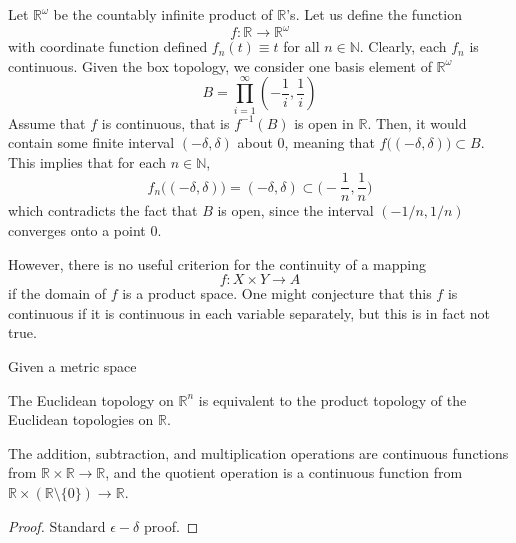   \begin{example}
    Let $\mathbb{R}^\omega$ be the countably infinite product of $\mathbb{R}$'s. Let us define the function 
    \begin{equation}
      f: \mathbb{R} \rightarrow \mathbb{R}^\omega
    \end{equation}
    with coordinate function defined $f_n (t) \equiv t$ for all $n \in \mathbb{N}$. Clearly, each $f_n$ is continuous. Given the box topology, we consider one basis element of $\mathbb{R}^\omega$
    \begin{equation}
      B = \prod_{i=1}^\infty (-\frac{1}{i}, \frac{1}{i})
    \end{equation}
    Assume that $f$ is continuous, that is $f^{-1}(B)$ is open in $\mathbb{R}$. Then, it would contain some finite interval $(-\delta, \delta)$ about $0$, meaning that $f\big( (-\delta, \delta)\big) \subset B$. This implies that for each $n \in \mathbb{N}$, 
    \begin{equation}
      f_n \big( (-\delta, \delta) \big) = (-\delta, \delta) \subset \Big( -\frac{1}{n}, \frac{1}{n} \Big)
    \end{equation}
    which contradicts the fact that $B$ is open, since the interval $(-1/n, 1/n)$ converges onto a point $0$. 
  \end{example}

  However, there is no useful criterion for the continuity of a mapping 
  \begin{equation}
    f: X \times Y \longrightarrow A
  \end{equation}
  if the domain of $f$ is a product space. One might conjecture that this $f$ is continuous if it is continuous in each variable separately, but this is in fact not true. 

  \begin{theorem}
    Given a metric space
  \end{theorem}

  \begin{corollary}
    The Euclidean topology on $\mathbb{R}^n$ is equivalent to the product topology of the Euclidean topologies on $\mathbb{R}$. 
  \end{corollary}

  \begin{lemma}
    The addition, subtraction, and multiplication operations are continuous functions from $\mathbb{R} \times \mathbb{R} \longrightarrow \mathbb{R}$, and the quotient operation is a continuous function from $\mathbb{R} \times (\mathbb{R} \setminus \{0\}) \longrightarrow \mathbb{R}$. 
  \end{lemma}
  \begin{proof}
    Standard $\epsilon-\delta$ proof. 
  \end{proof}

